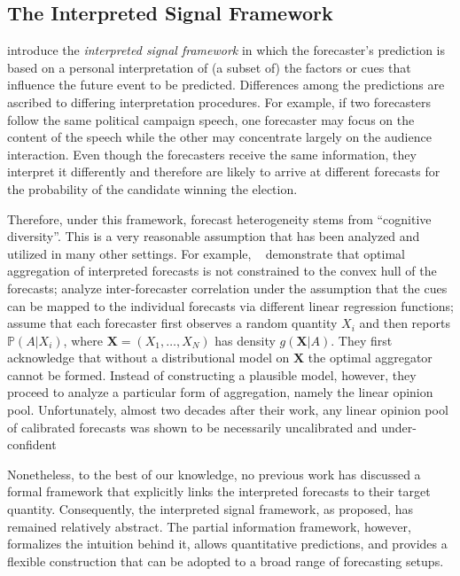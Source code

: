 \documentclass[11pt]{article}
\renewcommand{\P}{\mathbb{P}}
\theoremstyle{definition}
\theoremstyle{definition}
\def\P{{\mathbb P}}
\begin{document}
\subsection{The Interpreted Signal Framework}
\label{ss:inerpreted}

\citet{hong2009interpreted} introduce the {\em interpreted signal
framework} in which the forecaster's prediction is based on a personal
interpretation of (a subset of) the factors or cues that influence the
future event to be predicted.  Differences among the 
predictions are ascribed to differing interpretation procedures.  For
example, if two forecasters follow the same political campaign speech,
one forecaster may focus on the content of the speech while the other may
concentrate largely on the audience interaction.  Even though the
forecasters receive the same information, they interpret it
differently and therefore are likely to arrive at different forecasts for the probability of the candidate winning the election.

Therefore, under this framework, forecast heterogeneity stems from ``cognitive
diversity''.  This is a very reasonable assumption that has been analyzed and
utilized in many other settings.  For example,
~\citet{parunak2013characterizing} demonstrate that optimal
aggregation of interpreted forecasts is not constrained to the
convex hull of the forecasts; \citet{broomell2009experts} analyze
inter-forecaster correlation under the assumption that the cues can be
mapped to the individual forecasts via different linear regression
functions; \citet{degroot1991optimal} assume that each forecaster first observes a random quantity $X_i$ and then reports $\P(A | X_i)$, 
where $\boldsymbol{X} = (X_1, \dots, X_N)$ has density $g(\boldsymbol{X} | A)$. They first acknowledge that without a distributional model on $\boldsymbol{X}$ the optimal aggregator cannot be formed. Instead of constructing a plausible model, however, they proceed to analyze a particular form of aggregation, namely the linear opinion pool. Unfortunately, almost two decades after their work, any linear opinion pool of calibrated forecasts was shown to be necessarily uncalibrated and under-confident \citep{Ranjan08}


Nonetheless, to the best of our knowledge, no previous work has discussed a formal framework that explicitly links the interpreted forecasts to their target quantity. Consequently, the interpreted signal framework, as proposed, has remained relatively abstract. 
The partial information framework, however, formalizes the intuition behind it, allows quantitative predictions, and provides a flexible construction that can be adopted to a broad range of forecasting setups. 
\end{document}
